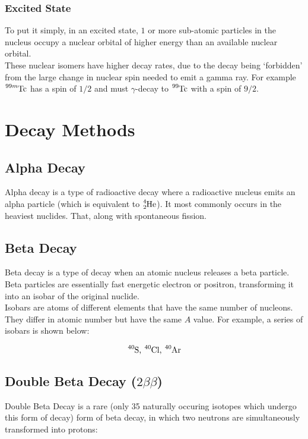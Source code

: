 \documentclass{article}
\begin{document}
\begin{multicols*}{2}
    \subsubsection{Excited State}
    To put it simply, in an excited state, $1$ or more sub-atomic particles in
    the nucleus occupy a nuclear orbital of higher energy than an available
    nuclear orbital.\\
    
    These nuclear isomers have higher decay rates, due to the decay being
    `forbidden' from the large change in nuclear spin needed to emit a
    gamma ray. For example $\ce{^{99m}Tc}$ has a spin of $1/2$ and must
    $\gamma$-decay to $\ce{^{99}Tc}$ with a spin of $9/2$.

    \section{Decay Methods}
    \subsection{Alpha Decay}
    Alpha decay is a type of radioactive decay where a radioactive nucleus
    emits an alpha particle (which is equivalent to $\ce{^4_2He}$). It most
    commonly occurs in the heaviest nuclides. That, along with spontaneous
    fission.

    \subsection{Beta Decay}
    Beta decay is a type of decay when an atomic nucleus releases a beta
    particle. Beta particles are essentially fast energetic electron or
    positron, transforming it into an isobar of the original nuclide.\\

    Isobars are atoms of different elements that have the same number of
    nucleons. They differ in atomic number but have the same $A$ value.
    For example, a series of isobars is shown below:

    \[
      \ce{^{40}S}\text{, }\ce{^{40}Cl}\text{, }\ce{^{40}Ar}
    \]

    \subsection{Double Beta Decay ($2\beta\beta$)}
    Double Beta Decay is a rare (only 35 naturally occuring isotopes which
    undergo this form of decay) form of beta decay, in which two neutrons
    are simultaneously transformed into protons:


\end{multicols*}
\end{document}

